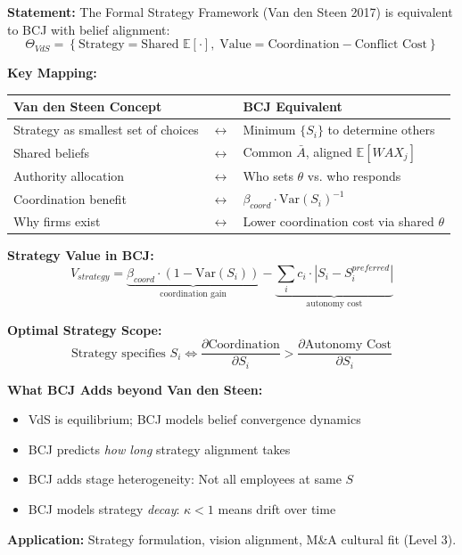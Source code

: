\begin{tcolorbox}[colback=green!5!white, colframe=green!75!black,
    title=Theorem BCJ-T36: Van den Steen Formal Theory of Strategy as Special Case]
\textbf{Statement:} The Formal Strategy Framework (Van den Steen 2017) is equivalent to BCJ with belief alignment:
\begin{equation}
\Theta_{VdS} = \left\{\text{Strategy} = \text{Shared } \mathbb{E}[\cdot], \; \text{Value} = \text{Coordination} - \text{Conflict Cost}\right\}
\end{equation}

\textbf{Key Mapping:}
\begin{center}
\begin{tabular}{lcl}
\toprule
\textbf{Van den Steen Concept} & & \textbf{BCJ Equivalent} \\
\midrule
Strategy as smallest set of choices & $\leftrightarrow$ & Minimum $\{S_i\}$ to determine others \\
Shared beliefs & $\leftrightarrow$ & Common $\bar{A}$, aligned $\mathbb{E}[WAX_j]$ \\
Authority allocation & $\leftrightarrow$ & Who sets $\theta$ vs. who responds \\
Coordination benefit & $\leftrightarrow$ & $\beta_{coord} \cdot \text{Var}(S_i)^{-1}$ \\
Why firms exist & $\leftrightarrow$ & Lower coordination cost via shared $\theta$ \\
\bottomrule
\end{tabular}
\end{center}

\textbf{Strategy Value in BCJ:}
\begin{equation}
V_{strategy} = \underbrace{\beta_{coord} \cdot (1 - \text{Var}(S_i))}_{\text{coordination gain}} - \underbrace{\sum_i c_i \cdot |S_i - S_i^{preferred}|}_{\text{autonomy cost}}
\end{equation}

\textbf{Optimal Strategy Scope:}
\begin{equation}
\text{Strategy specifies } S_i \Leftrightarrow \frac{\partial \text{Coordination}}{\partial S_i} > \frac{\partial \text{Autonomy Cost}}{\partial S_i}
\end{equation}

\textbf{What BCJ Adds beyond Van den Steen:}
\begin{itemize}[nosep]
\item VdS is equilibrium; BCJ models belief convergence dynamics
\item BCJ predicts \textit{how long} strategy alignment takes
\item BCJ adds stage heterogeneity: Not all employees at same $S$
\item BCJ models strategy \textit{decay}: $\kappa < 1$ means drift over time
\end{itemize}

\textbf{Application:} Strategy formulation, vision alignment, M\&A cultural fit (Level 3).
\end{tcolorbox}

